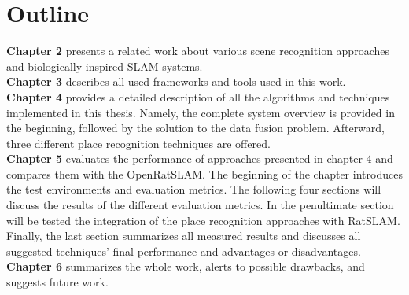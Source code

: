 \section{Outline}\label{section:outline}

\textbf{Chapter 2} presents a related work about various scene recognition approaches and biologically inspired SLAM systems.\\
\textbf{Chapter 3} describes all used frameworks and tools used in this work.\\
\textbf{Chapter 4} provides a detailed description of all the algorithms and techniques implemented in this thesis. Namely, the complete system overview is provided in the beginning, followed by the solution to the data fusion problem. Afterward, three different place recognition techniques are offered.\\
\textbf{Chapter 5} evaluates the performance of approaches presented in chapter 4 and compares them with the OpenRatSLAM. The beginning of the chapter introduces the test environments and evaluation metrics. The following four sections will discuss the results of the different evaluation metrics. In the penultimate section will be tested the integration of the place recognition approaches with RatSLAM. Finally, the last section summarizes all measured results and discusses all suggested techniques' final performance and advantages or disadvantages.\\
\textbf{Chapter 6} summarizes the whole work, alerts to possible drawbacks, and suggests future work.\\
